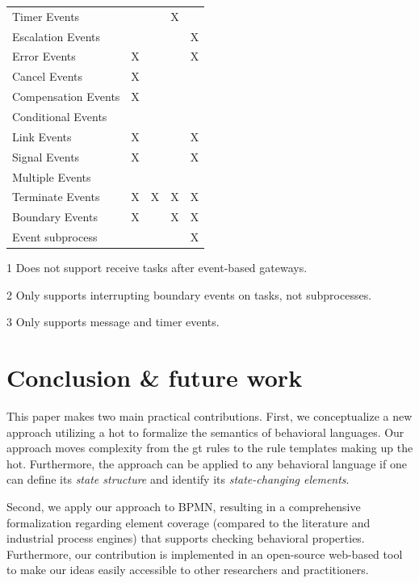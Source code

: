\documentclass[runningheads]{llncs}
\begin{document}
\begin{table}[htbp]
\begin{threeparttable}
\begin{tabular}{l l l l l}
      Timer Events & & & X & \\
      Escalation Events & & & & X\\
      Error Events & X & & & X\\
      Cancel Events & X & & &\\
      Compensation Events & X & & &\\
      Conditional Events & & & &\\
      Link Events & X & & & X\\
      Signal Events & X & & & X\\
      Multiple Events &  & & & \\
      Terminate Events & X & X & X & X\\
     Boundary Events & X\tnote{2} & & X\tnote{3} & X\\ %
      Event subprocess &  &  &  & X\\
    \end{tabular}
    \begin{tablenotes}
        \item[1] Does not support receive tasks after event-based gateways.
        \item[2] Only supports interrupting boundary events on tasks, not subprocesses.
        \item[3] Only supports message and timer events.
    \end{tablenotes}
    \end{threeparttable}
\end{table}


\section{Conclusion \& future work} \label{sec:conclusion}
This paper makes two main practical contributions.
First, we conceptualize a new approach utilizing a \gls*{hot} to formalize the semantics of behavioral languages.
Our approach moves complexity from the \gls*{gt} rules to the rule templates making up the \gls*{hot}.
Furthermore, the approach can be applied to any behavioral language if one can define its \textit{state structure} and identify its \textit{state-changing elements}.

Second, we apply our approach to BPMN, resulting in a comprehensive formalization regarding element coverage (compared to the literature and industrial process engines) that supports checking behavioral properties.
Furthermore, our contribution is implemented in an open-source web-based tool to make our ideas easily accessible to other researchers and practitioners.
\end{document}
